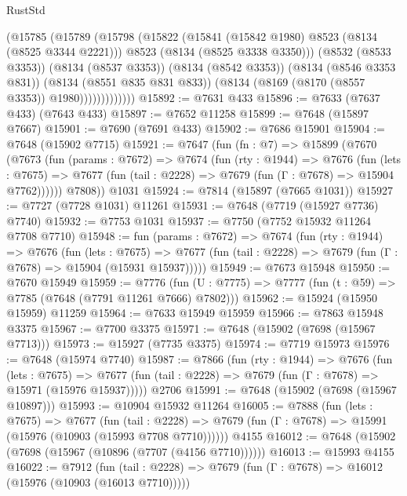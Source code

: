 \begin{lexlean}{RustStd}
\begin{coremodule}
{\begin{coremodule}
{{{{{{{{{{{{{{{{{{{{{{{{{{{{{{{{{{{{{{{{{{{{{{{{{{{{{                    (@15785
                      (@15789
                        (@15798
                          (@15822
                            (@15841 (@15842 @1980) @8523 (@8134 (@8525 @3344 @2221)))
                            @8523
                            (@8134 (@8525 @3338 @3350)))
                          (@8532 (@8533 @3353))
                          (@8134 (@8537 @3353))
                          (@8134 (@8542 @3353))
                          (@8134 (@8546 @3353 @831))
                          (@8134 (@8551 @835 @831 @833))
                          (@8134 (@8169 (@8170 (@8557 @3353)) @1980)))))))))))))
@15892 := @7631 @433
@15896 := @7633 (@7637 @433) (@7643 @433)
@15897 := @7652 @11258
@15899 := @7648 (@15897 @7667)
@15901 := @7690 (@7691 @433)
@15902 := @7686 @15901
@15904 := @7648 (@15902 @7715)
@15921 := @7647
    (fun (fn : @7) =>
    @15899
      (@7670
        (@7673
          (fun (params : @7672) =>
          @7674
            (fun (rty : @1944) =>
            @7676
              (fun (lets : @7675) =>
              @7677 (fun (tail : @2228) => @7679 (fun (Γ : @7678) => @15904 @7762))))))
        @7808))
    @1031
@15924 := @7814 (@15897 (@7665 @1031))
@15927 := @7727 (@7728 @1031) @11261
@15931 := @7648 (@7719 (@15927 @7736) @7740)
@15932 := @7753 @1031
@15937 := @7750 (@7752 @15932 @11264 @7708 @7710)
@15948 := fun (params : @7672) =>
  @7674
    (fun (rty : @1944) =>
    @7676
      (fun (lets : @7675) =>
      @7677 (fun (tail : @2228) => @7679 (fun (Γ : @7678) => @15904 (@15931 @15937)))))
@15949 := @7673 @15948
@15950 := @7670 @15949
@15959 := @7776
    (fun (U : @7775) => @7777 (fun (t : @59) => @7785 (@7648 (@7791 @11261 @7666) @7802)))
@15962 := @15924 (@15950 @15959) @11259
@15964 := @7633 @15949 @15959
@15966 := @7863 @15948 @3375
@15967 := @7700 @3375
@15971 := @7648 (@15902 (@7698 (@15967 @7713)))
@15973 := @15927 (@7735 @3375)
@15974 := @7719 @15973
@15976 := @7648 (@15974 @7740)
@15987 := @7866
    (fun (rty : @1944) =>
    @7676
      (fun (lets : @7675) =>
      @7677 (fun (tail : @2228) => @7679 (fun (Γ : @7678) => @15971 (@15976 @15937)))))
    @2706
@15991 := @7648 (@15902 (@7698 (@15967 @10897)))
@15993 := @10904 @15932 @11264
@16005 := @7888
    (fun (lets : @7675) =>
    @7677
      (fun (tail : @2228) =>
      @7679 (fun (Γ : @7678) => @15991 (@15976 (@10903 (@15993 @7708 @7710))))))
    @4155
@16012 := @7648 (@15902 (@7698 (@15967 (@10896 (@7707 (@4156 @7710))))))
@16013 := @15993 @4155
@16022 := @7912
    (fun (tail : @2228) => @7679 (fun (Γ : @7678) => @16012 (@15976 (@10903 (@16013 @7710)))))
}}}}}}}}}}}}}}}}}}}}}}}}}}}}}}}}}}}}}}}}}}}}}}}}}}}}}
\end{coremodule}}
\end{coremodule}
\end{lexlean}
